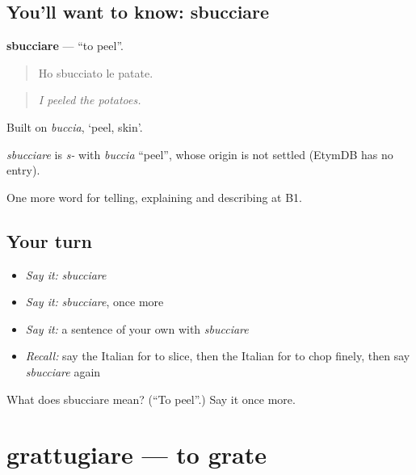 \subsection*{You'll want to know: sbucciare}
\textbf{sbucciare} — \textquotedblleft{}to peel\textquotedblright{}.

\begin{quote}
Ho sbucciato le patate.
\end{quote}

\begin{quote}
\emph{I peeled the potatoes.}
\end{quote}

Built on \emph{buccia}, ‘peel, skin’.

\begin{cousinweb}
\emph{sbucciare} is \emph{s-} with \emph{buccia} \textquotedblleft{}peel\textquotedblright{}, whose origin is not settled (EtymDB has no entry).
\end{cousinweb}

\begin{grammarlens}[title={What you've built}]
One more word for telling, explaining and describing at B1.
\end{grammarlens}

\subsection*{Your turn}
\begin{itemize}
\raggedright
  \item \emph{Say it:} \emph{sbucciare}
  \item \emph{Say it:} \emph{sbucciare}, once more
  \item \emph{Say it:} a sentence of your own with \emph{sbucciare}
  \item \emph{Recall:} say the Italian for to slice, then the Italian for to chop finely, then say \emph{sbucciare} again
\end{itemize}

\begin{tcolorbox}[breakable,colback=teal!4,colframe=teal!35!black,title={Before you move on}]
What does sbucciare mean? (\textquotedblleft{}To peel\textquotedblright{}.) Say it once more.
\end{tcolorbox}
\section[grattugiare]{grattugiare — to grate}

